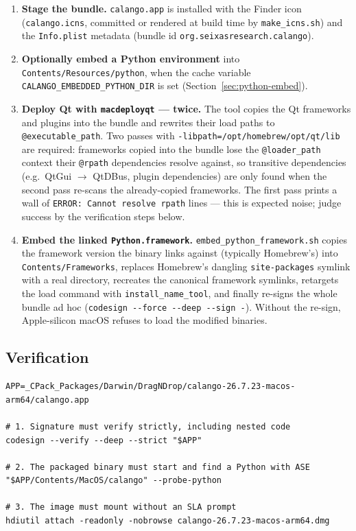 \documentclass[11pt,a4paper]{article}
\newcommand{\file}[1]{\texttt{#1}}
\newcommand{\opt}[1]{\texttt{#1}}
\begin{document}
\begin{enumerate}[itemsep=2pt]
  \item \textbf{Stage the bundle.} \file{calango.app} is installed with
        the Finder icon (\file{calango.icns}, committed or rendered at
        build time by \file{make\_icns.sh}) and the \file{Info.plist}
        metadata (bundle id \texttt{org.seixasresearch.calango}).
  \item \textbf{Optionally embed a Python environment} into
        \file{Contents/Resources/python}, when the cache variable
        \opt{CALANGO\_EMBEDDED\_PYTHON\_DIR} is set
        (Section~\ref{sec:python-embed}).
  \item \textbf{Deploy Qt with \file{macdeployqt} --- twice.} The tool
        copies the Qt frameworks and plugins into the bundle and rewrites
        their load paths to \texttt{@executable\_path}. Two passes with
        \opt{-libpath=/opt/homebrew/opt/qt/lib} are required: frameworks
        copied into the bundle lose the \texttt{@loader\_path} context
        their \texttt{@rpath} dependencies resolve against, so
        transitive dependencies (e.g.\ QtGui $\to$ QtDBus, plugin
        dependencies) are only found when the second pass re-scans the
        already-copied frameworks. The first pass prints a wall of
        \texttt{ERROR: Cannot resolve rpath} lines --- this is expected
        noise; judge success by the verification steps below.
  \item \textbf{Embed the linked \file{Python.framework}.}
        \file{embed\_python\_framework.sh} copies the framework version
        the binary links against (typically Homebrew's) into
        \file{Contents/Frameworks}, replaces Homebrew's dangling
        \file{site-packages} symlink with a real directory, recreates the
        canonical framework symlinks, retargets the load command with
        \file{install\_name\_tool}, and finally re-signs the whole bundle
        ad hoc (\lstinline|codesign --force --deep --sign -|). Without
        the re-sign, Apple-silicon macOS refuses to load the modified
        binaries.
\end{enumerate}

\subsection{Verification}

\begin{lstlisting}
APP=_CPack_Packages/Darwin/DragNDrop/calango-26.7.23-macos-arm64/calango.app

# 1. Signature must verify strictly, including nested code
codesign --verify --deep --strict "$APP"

# 2. The packaged binary must start and find a Python with ASE
"$APP/Contents/MacOS/calango" --probe-python

# 3. The image must mount without an SLA prompt
hdiutil attach -readonly -nobrowse calango-26.7.23-macos-arm64.dmg
\end{lstlisting}
\end{document}
